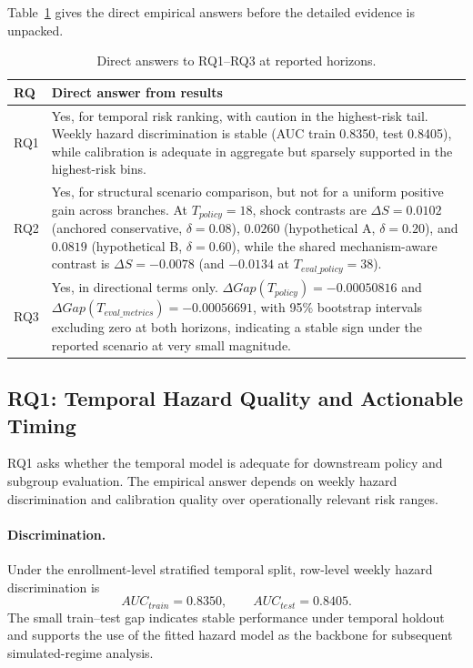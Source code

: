 Table~\ref{tab:rq_answers} gives the direct empirical answers before the detailed evidence is unpacked.

\begin{table}[!t]
\centering
\scriptsize
\renewcommand{\arraystretch}{1.05}
\caption{Direct answers to RQ1--RQ3 at reported horizons.}
\label{tab:rq_answers}
\begin{tabular}{@{}>{\raggedright\arraybackslash}p{}
                >{\raggedright\arraybackslash}p{}@{}}
\hline
RQ & Direct answer from results \\
\hline
RQ1 &
Yes, for temporal risk ranking, with caution in the highest-risk tail. Weekly hazard discrimination is stable (AUC train 0.8350, test 0.8405), while calibration is adequate in aggregate but sparsely supported in the highest-risk bins. \\

RQ2 &
Yes, for structural scenario comparison, but not for a uniform positive gain across branches. At $T_{policy}=18$, shock contrasts are $\Delta S=0.0102$ (anchored conservative, $\delta=0.08$), $0.0260$ (hypothetical A, $\delta=0.20$), and $0.0819$ (hypothetical B, $\delta=0.60$), while the shared mechanism-aware contrast is $\Delta S=-0.0078$ (and $-0.0134$ at $T_{eval\_policy}=38$). \\

RQ3 &
Yes, in directional terms only. $\Delta Gap(T_{policy})=-0.00050816$ and $\Delta Gap(T_{eval\_metrics})=-0.00056691$, with 95\% bootstrap intervals excluding zero at both horizons, indicating a stable sign under the reported scenario at very small magnitude. \\
\hline
\end{tabular}
\end{table}

\subsection{RQ1: Temporal Hazard Quality and Actionable Timing}
\label{subsec:rq1_results}

RQ1 asks whether the temporal model is adequate for downstream policy and subgroup evaluation. The empirical answer depends on weekly hazard discrimination and calibration quality over operationally relevant risk ranges.

\paragraph*{Discrimination.}
Under the enrollment-level stratified temporal split, row-level weekly hazard discrimination is
\begin{equation*}
AUC_{train}=0.8350, \qquad AUC_{test}=0.8405.
\end{equation*}
The small train--test gap indicates stable performance under temporal holdout and supports the use of the fitted hazard model as the backbone for subsequent simulated-regime analysis.

